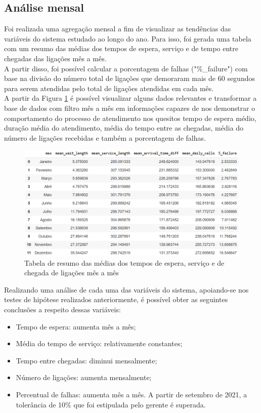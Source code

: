 \subsection{Análise mensal}
Foi realizada uma agregação mensal a fim de visualizar as tendências das variáveis do sistema estudado ao longo do ano. Para isso, foi gerada uma tabela com um resumo das médias dos tempos de espera, serviço e de tempo entre chegadas das ligações mês a mês.\\
A partir disso, foi possível calcular a porcentagem de falhas ("\%\_failure") com base na divisão do número total de ligações que demoraram mais de 60 segundos para serem atendidas pelo total de ligações atendidas em cada mês.\\
A partir da Figura \ref*{fig: tmes} é possível visualizar alguns dados relevantes e transformar a base de dados com filtro mês a mês em informações capazes de nos demonstrar o comportamento do processo de atendimento nos quesitos tempo de espera médio, duração média do atendimento, média do tempo entre as chegadas, média do número de ligações recebidas e também a porcentagem de falhas.  

\begin{figure}[H]
    \includegraphics[scale=0.75]{analise-de-dados/mensal/tabmens.png}
    \caption{Tabela de resumo das médias dos tempos de espera, serviço e de chegada de ligações mês a mês}
    \label{fig: tmes}
\end{figure}

Realizando uma análise de cada uma das variáveis do sistema, apoiando-se nos testes de hipótese realizados anteriormente, é possível obter as seguintes conclusões a respeito dessas variáveis:
\begin{itemize}
    \item Tempo de espera: aumenta mês a mês;
    \item Média do tempo de serviço: relativamente constantes;
    \item Tempo entre chegadas: diminui mensalmente;
    \item Número de ligações: aumenta mensalmente;
    \item Percentual de falhas: aumenta mês a mês. A partir de setembro de 2021, a tolerância de 10\% que foi estipulada pelo
     gerente é superada.\\
\end{itemize}


